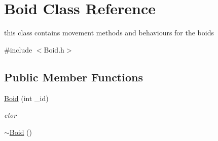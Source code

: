 \hypertarget{classBoid}{\section{Boid Class Reference}
\label{classBoid}
}


this class contains movement methods and behaviours for the boids  




{\ttfamily \#include $<$Boid.\-h$>$}

\subsection*{Public Member Functions}
\begin{DoxyCompactItemize}
\item 
\hyperlink{classBoid_a5d1abb62ea2b9f7adc764d648614bf51}{Boid} (int \-\_\-id)
\begin{DoxyCompactList}\small\item\em ctor \end{DoxyCompactList}\item 
\hypertarget{classBoid_a712f84ddc1b8ad06ad7ecd6c10a1666c}{\hyperlink{classBoid_a712f84ddc1b8ad06ad7ecd6c10a1666c}{$\sim$\-Boid} ()}\label{classBoid_a712f84ddc1b8ad06ad7ecd6c10a1666c}


\end{DoxyCompactItemize}
